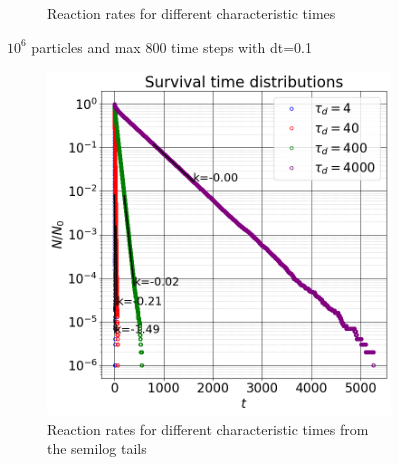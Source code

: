 \documentclass{article}
\begin{document}
\begin{figure}[htbp]
\begin{subfigure}[b]{0.48\textwidth}
        \caption{Reaction rates for different characteristic times}
    \end{subfigure}
    \caption{$10^6$ particles and max 800 time steps with dt=0.1}
    \label{fig:survTimeDistTau}
\end{figure}

\begin{figure}[htbp]
    \centering
    \begin{subfigure}[b]{0.48\textwidth}
        \centering
        \includegraphics[width=\textwidth]{images/survTimeDistSemilogTau.png}
        \caption{Reaction rates for different characteristic times from the semilog tails}
    \end{subfigure}
    \hfill
    \begin{subfigure}[b]{0.48\textwidth}
        \centering

\end{subfigure}
\end{figure}
\end{document}
